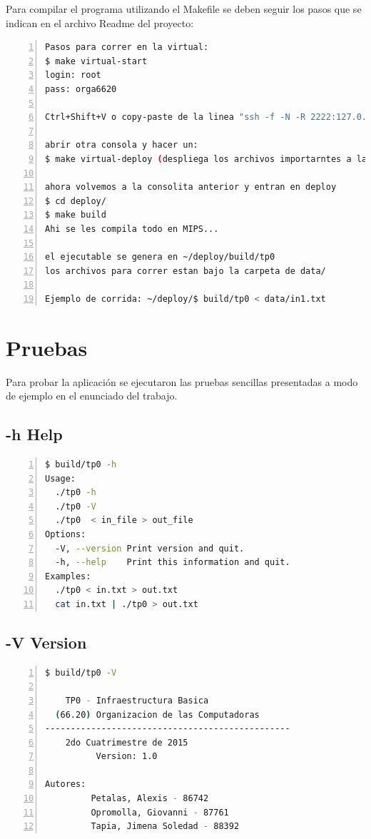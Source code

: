 \documentclass[a4paper,10pt]{article}
\begin{document}
Para compilar el programa utilizando el Makefile se deben seguir los pasos que se indican en el archivo Readme del proyecto: \\
\begin{lstlisting}[numbers=left,language=bash]
Pasos para correr en la virtual:
$ make virtual-start
login: root
pass: orga6620

Ctrl+Shift+V o copy-paste de la linea "ssh -f -N -R 2222:127.0.0.1:22 giovanni@172.20.0.1"

abrir otra consola y hacer un:
$ make virtual-deploy (despliega los archivos importarntes a la virtual)

ahora volvemos a la consolita anterior y entran en deploy
$ cd deploy/
$ make build
Ahi se les compila todo en MIPS... 

el ejecutable se genera en ~/deploy/build/tp0
los archivos para correr estan bajo la carpeta de data/

Ejemplo de corrida: ~/deploy/$ build/tp0 < data/in1.txt
\end{lstlisting}
\newpage

\section{Pruebas}

Para probar la aplicaci\'on se ejecutaron las pruebas sencillas presentadas a modo de ejemplo en el enunciado del trabajo. \\

\subsection{-h Help}

\begin{lstlisting}[numbers=left,language=bash]
  $ build/tp0 -h
Usage:
  ./tp0 -h
  ./tp0 -V
  ./tp0  < in_file > out_file
Options:
  -V, --version	Print version and quit.
  -h, --help	Print this information and quit.
Examples:
  ./tp0 < in.txt > out.txt
  cat in.txt | ./tp0 > out.txt

\end{lstlisting}



\subsection{-V Version}


\begin{lstlisting}[numbers=left,language=bash]
	$ build/tp0 -V

	TP0 - Infraestructura Basica
  (66.20) Organizacion de las Computadoras
------------------------------------------------
	2do Cuatrimestre de 2015
	      Version: 1.0

Autores:
         Petalas, Alexis - 86742
         Opromolla, Giovanni - 87761
         Tapia, Jimena Soledad - 88392

\end{lstlisting}
\end{document}
